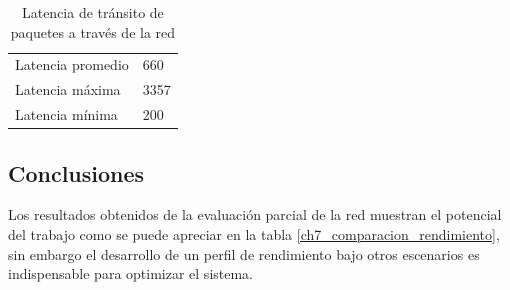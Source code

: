 \begin{table}[]
	\centering
		\begin{tabular}{ll}
			Latencia promedio          & 660          \\
			Latencia máxima            & 3357         \\
			Latencia mínima            & 200         
		\end{tabular}
	\caption{Latencia de tránsito de paquetes a través de la red}
	\label{table:ch7_latency}
\end{table}



\subsection{Conclusiones}
	\label{ch7_conclusiones}

Los resultados obtenidos de la evaluación parcial de la red muestran el potencial del trabajo como se puede apreciar en la tabla \ref{ch7_comparacion_rendimiento}, sin embargo el desarrollo de un perfil de rendimiento bajo otros escenarios es indispensable para optimizar el sistema.


